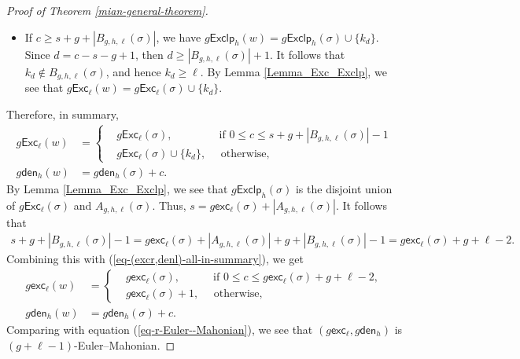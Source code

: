 \documentclass[12pt]{article}
\begin{document}
\begin{proof}[Proof of Theorem \ref{mian-general-theorem}]
\begin{itemize}
		\item[$\bullet$]
		If $c\geq s+g+|B_{g,h,\ell}(\sigma)|$,
		we have $g\textsf{Exclp}_{h}(w)=g\textsf{Exclp}_{h}(\sigma)\cup\{k_{d}\}$.
		Since $d=c-s-g+1$, then $d\geq|B_{g,h,\ell}(\sigma)|+1$.		
		It follows that $k_{d}\notin B_{g,h,\ell}(\sigma)$, and hence $k_{d}\geq\ell$. 
		By Lemma \ref{Lemma_Exc_Exclp}, we see that $g\textsf{Exc}_{\ell}(w)=g\textsf{Exc}_{\ell}(\sigma)\cup\{k_{d}\}$.
	\end{itemize}
	Therefore, in summary,
\begin{equation}\label{eq-(excr,denl)-all-in-summary}
	\begin{split}
		g\textsf{Exc}_{\ell}(w)&=\left
		\{
		\begin{aligned}
			&g\textsf{Exc}_{\ell}(\sigma), \quad\quad\quad\quad~\text{if~}0\leq c\leq s+g+|B_{g,h,\ell}(\sigma)|-1\\
			&g\textsf{Exc}_{\ell}(\sigma)\cup\{k_{d}\},\quad\text{~otherwise,}
		\end{aligned}
		\right.\\ 
		g\textsf{den}_{h}(w)&=g\textsf{den}_{h}(\sigma)+c.
	\end{split}
\end{equation}	
By Lemma \ref{Lemma_Exc_Exclp}, we see that $g\textsf{Exclp}_{h}(\sigma)$ is the disjoint union of $g\textsf{Exc}_{\ell}(\sigma)$ and $A_{g,h,\ell}(\sigma)$.
Thus, $s=g\textsf{exc}_{\ell}(\sigma)+|A_{g,h,\ell}(\sigma)|$.
It follows that     
\begin{align*}
	s+g+|B_{g,h,\ell}(\sigma)|-1=g\textsf{exc}_{\ell}(\sigma)+|A_{g,h,\ell}(\sigma)|+g+|B_{g,h,\ell}(\sigma)|-1
	=g\textsf{exc}_{\ell}(\sigma)+g+\ell-2.
\end{align*}
Combining this with (\ref{eq-(excr,denl)-all-in-summary}), we get
	\begin{equation*}
		\begin{split}
			g\textsf{exc}_{\ell}(w)&=\left
			\{
			\begin{aligned}
				&g\textsf{exc}_{\ell}(\sigma), \quad\quad\quad\text{if~}0\leq c\leq g\textsf{exc}_{\ell}(\sigma)+g+\ell-2,\\
				&g\textsf{exc}_{\ell}(\sigma)+1,\quad\text{~otherwise,}
			\end{aligned}
			\right.\\ 
			g\textsf{den}_{h}(w)&=g\textsf{den}_{h}(\sigma)+c.
		\end{split}
	\end{equation*}
	Comparing with equation (\ref{eq-r-Euler--Mahonian}),
	we see that $(g\textsf{exc}_{\ell},g\textsf{den}_{h})$ is $(g+\ell-1)$-Euler--Mahonian.
\end{proof}
\end{document}
